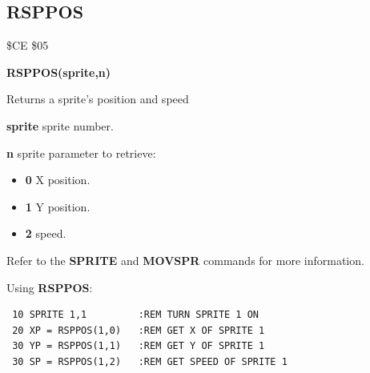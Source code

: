 \subsection{RSPPOS}
\begin{description}[leftmargin=2cm,style=nextline]
\item [Token:] \$CE \$05
\item [Format:] {\bf RSPPOS(sprite,n)}
\item [Usage:]  Returns a sprite's position and speed

                {\bf sprite} sprite number.

                {\bf n} sprite parameter to retrieve:

                \begin{itemize}
                    \item {\bf 0} X position.
                    \item {\bf 1} Y position.
                    \item {\bf 2} speed.
                \end{itemize}

\item [Remarks:] Refer to the {\bf SPRITE} and {\bf MOVSPR} commands for more information.

\item [Example:] Using {\bf RSPPOS}:
\begin{tcolorbox}[colback=black,coltext=white]
\verbatimfont{\codefont}
\begin{verbatim}
 10 SPRITE 1,1         :REM TURN SPRITE 1 ON
 20 XP = RSPPOS(1,0)   :REM GET X OF SPRITE 1
 30 YP = RSPPOS(1,1)   :REM GET Y OF SPRITE 1
 30 SP = RSPPOS(1,2)   :REM GET SPEED OF SPRITE 1
\end{verbatim}
\end{tcolorbox}
\end{description}


\newpage
